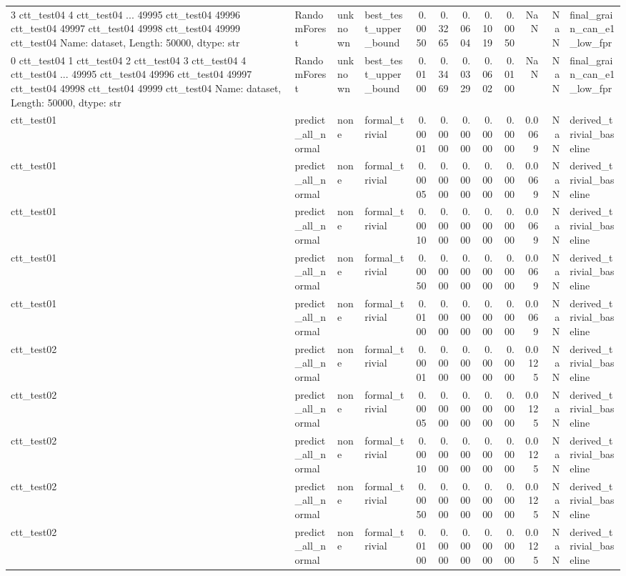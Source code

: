 \begin{tabular}{llllrrrrrrrl}
3        ctt_test04
4        ctt_test04
            ...    
49995    ctt_test04
49996    ctt_test04
49997    ctt_test04
49998    ctt_test04
49999    ctt_test04
Name: dataset, Length: 50000, dtype: str & RandomForest & unknown & best_test_upper_bound & 0.0050 & 0.3265 & 0.0604 & 0.1019 & 0.0050 & NaN & NaN & final_grain_can_e1_low_fpr \\
0        ctt_test04
1        ctt_test04
2        ctt_test04
3        ctt_test04
4        ctt_test04
            ...    
49995    ctt_test04
49996    ctt_test04
49997    ctt_test04
49998    ctt_test04
49999    ctt_test04
Name: dataset, Length: 50000, dtype: str & RandomForest & unknown & best_test_upper_bound & 0.0100 & 0.3469 & 0.0329 & 0.0602 & 0.0100 & NaN & NaN & final_grain_can_e1_low_fpr \\
ctt_test01 & predict_all_normal & none & formal_trivial & 0.0001 & 0.0000 & 0.0000 & 0.0000 & 0.0000 & 0.0069 & NaN & derived_trivial_baseline \\
ctt_test01 & predict_all_normal & none & formal_trivial & 0.0005 & 0.0000 & 0.0000 & 0.0000 & 0.0000 & 0.0069 & NaN & derived_trivial_baseline \\
ctt_test01 & predict_all_normal & none & formal_trivial & 0.0010 & 0.0000 & 0.0000 & 0.0000 & 0.0000 & 0.0069 & NaN & derived_trivial_baseline \\
ctt_test01 & predict_all_normal & none & formal_trivial & 0.0050 & 0.0000 & 0.0000 & 0.0000 & 0.0000 & 0.0069 & NaN & derived_trivial_baseline \\
ctt_test01 & predict_all_normal & none & formal_trivial & 0.0100 & 0.0000 & 0.0000 & 0.0000 & 0.0000 & 0.0069 & NaN & derived_trivial_baseline \\
ctt_test02 & predict_all_normal & none & formal_trivial & 0.0001 & 0.0000 & 0.0000 & 0.0000 & 0.0000 & 0.0125 & NaN & derived_trivial_baseline \\
ctt_test02 & predict_all_normal & none & formal_trivial & 0.0005 & 0.0000 & 0.0000 & 0.0000 & 0.0000 & 0.0125 & NaN & derived_trivial_baseline \\
ctt_test02 & predict_all_normal & none & formal_trivial & 0.0010 & 0.0000 & 0.0000 & 0.0000 & 0.0000 & 0.0125 & NaN & derived_trivial_baseline \\
ctt_test02 & predict_all_normal & none & formal_trivial & 0.0050 & 0.0000 & 0.0000 & 0.0000 & 0.0000 & 0.0125 & NaN & derived_trivial_baseline \\
ctt_test02 & predict_all_normal & none & formal_trivial & 0.0100 & 0.0000 & 0.0000 & 0.0000 & 0.0000 & 0.0125 & NaN & derived_trivial_baseline \\

\end{tabular}
